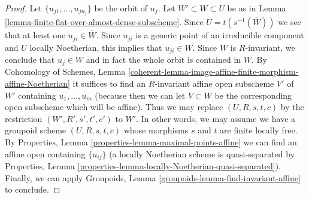\documentclass{stacks-project}
\theoremstyle{plain}
\theoremstyle{definition}
\theoremstyle{remark}
\numberwithin{equation}{subsection}
\begin{document}
\begin{proof}
Let $\{u_{j1}, \ldots, u_{jn_j}\}$ be the orbit of $u_j$.
Let $W' \subset W \subset U$ be as in
Lemma \ref{lemma-finite-flat-over-almost-dense-subscheme}.
Since $U = t(s^{-1}(\overline{W}))$ we see that at least
one $u_{ji} \in \overline{W}$. Since $u_{ji}$ is a generic point
of an irreducible component and $U$ locally Noetherian,
this implies that $u_{ji} \in W$. Since $W$ is $R$-invariant, we
conclude that $u_j \in W$ and in fact the whole orbit is contained in $W$.
By Cohomology of Schemes, Lemma
\ref{coherent-lemma-image-affine-finite-morphism-affine-Noetherian}
it suffices to find an $R$-invariant affine open subscheme $V'$
of $W'$ containing $u_1, \ldots, u_m$ (because then we can let $V \subset W$
be the corresponding open subscheme which will be affine).
Thus we may replace $(U, R, s, t, c)$
by the restriction $(W', R', s', t', c')$ to $W'$.
In other words, we may assume we have a groupoid scheme $(U, R, s, t, c)$
whose morphisms $s$ and $t$ are finite locally free.
By Properties, Lemma \ref{properties-lemma-maximal-points-affine}
we can find an affine open containing $\{u_{ij}\}$
(a locally Noetherian scheme is quasi-separated by
Properties, Lemma \ref{properties-lemma-locally-Noetherian-quasi-separated}).
Finally, we can apply
Groupoids, Lemma \ref{groupoids-lemma-find-invariant-affine}
to conclude.
\end{proof}
\end{document}
